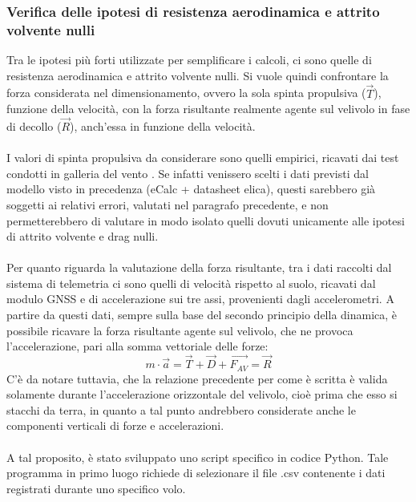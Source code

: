 \documentclass[12pt]{article}
\begin{document}
\subsubsection{Verifica delle ipotesi di resistenza aerodinamica e attrito volvente nulli}
Tra le ipotesi più forti utilizzate per semplificare i calcoli, ci sono quelle di resistenza aerodinamica e attrito volvente nulli. Si vuole quindi confrontare la forza considerata nel dimensionamento, ovvero la sola spinta propulsiva ($\overrightarrow{T}$), funzione della velocità, con la forza risultante realmente agente sul velivolo in fase di decollo ($\overrightarrow{R}$), anch'essa in funzione della velocità. 
\\\\
I valori di spinta propulsiva da considerare sono quelli empirici, ricavati dai test condotti in galleria del vento \cite{windtunnel}. Se infatti venissero scelti i dati previsti dal modello visto in precedenza (eCalc + datasheet elica), questi sarebbero già soggetti ai relativi errori, valutati nel paragrafo precedente, e non permetterebbero di valutare in modo isolato quelli dovuti unicamente alle ipotesi di attrito volvente e drag nulli.
\\\\
Per quanto riguarda la valutazione della forza risultante, tra i dati raccolti dal sistema di telemetria ci sono quelli di velocità rispetto al suolo, ricavati dal modulo GNSS e di accelerazione sui tre assi, provenienti dagli accelerometri. A partire da questi dati, sempre sulla base del secondo principio della dinamica, è possibile ricavare la forza risultante agente sul velivolo, che ne provoca l'accelerazione, pari alla somma vettoriale delle forze:
\begin{equation}
m \cdot \overrightarrow{a} = \overrightarrow{T} + \overrightarrow{D} + \overrightarrow{F_{AV}} = \overrightarrow{R}
\end{equation}
C'è da notare tuttavia, che la relazione precedente per come è scritta è valida solamente durante l'accelerazione orizzontale del velivolo, cioè prima che esso si stacchi da terra, in quanto a tal punto andrebbero considerate anche le componenti verticali di forze e accelerazioni.
\\\\
\noindent
A tal proposito, è stato sviluppato uno script specifico in codice Python. Tale programma in primo luogo richiede di selezionare il file .csv contenente i dati registrati durante uno specifico volo. 
\\\\
\end{document}
